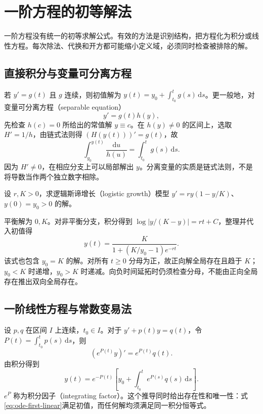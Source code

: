 \setcounter{chapter}{1} %
\chapter{一阶方程的初等解法}
\label{chap:ode-first-order}

一阶方程没有统一的初等求解公式。有效的方法是识别结构，把方程化为积分或线性方程。每次除法、代换和开方都可能缩小定义域，必须同时检查被排除的解。

\section{直接积分与变量可分离方程}
若 $y'=g(t)$ 且 $g$ 连续，则初值解为 $y(t)=y_0+\int_{t_0}^t g(s)\,\mathrm ds$。更一般地，对变量可分离方程（separable equation）
\[
 y'=g(t)h(y),
\]
先检查 $h(c)=0$ 所给出的常值解 $y\equiv c$。在 $h(y)\ne0$ 的区间上，选取 $H'=1/h$，由链式法则得 $(H(y(t)))'=g(t)$，故
\begin{equation}
 \int_{y_0}^{y(t)}\frac{\mathrm du}{h(u)}=\int_{t_0}^t g(s)\,\mathrm ds.
 \label{eq:ode-separable}
\end{equation}
因为 $H'\ne0$，在相应分支上可以局部解出 $y$。分离变量的实质是链式法则，不是将导数当作两个独立数字相除。

\begin{example}[Logistic 增长]
设 $r,K>0$，求逻辑斯谛增长（logistic growth）模型 $y'=ry(1-y/K)$、$y(0)=y_0>0$ 的解。
\end{example}
\begin{solve}
平衡解为 $0,K$。对非平衡分支，积分得到 $\log|y/(K-y)|=rt+C$，整理并代入初值得
\begin{equation}
 y(t)=\frac{K}{1+(K/y_0-1)e^{-rt}}.
 \label{eq:ode-logistic}
\end{equation}
该式也包含 $y_0=K$ 的解。对所有 $t\geq0$ 分母为正，故正向解全局存在且趋于 $K$；$y_0<K$ 时递增，$y_0>K$ 时递减。向负时间延拓时仍须检查分母，不能由正向全局存在推出双向全局存在。
\end{solve}

\section{一阶线性方程与常数变易法}
设 $p,q$ 在区间 $I$ 上连续，$t_0\in I$。对于 $y'+p(t)y=q(t)$，令 $P(t)=\int_{t_0}^t p(s)\,\mathrm ds$，则
\[
 (e^{P(t)}y)'=e^{P(t)}q(t).
\]
由积分得到
\begin{equation}
 y(t)=e^{-P(t)}\left[y_0+\int_{t_0}^t e^{P(s)}q(s)\,\mathrm ds\right].
 \label{eq:ode-first-linear}
\end{equation}
$e^P$ 称为积分因子（integrating factor）。这个推导同时给出存在性和唯一性：式\eqref{eq:ode-first-linear}满足初值，而任何解均须满足同一积分恒等式。

